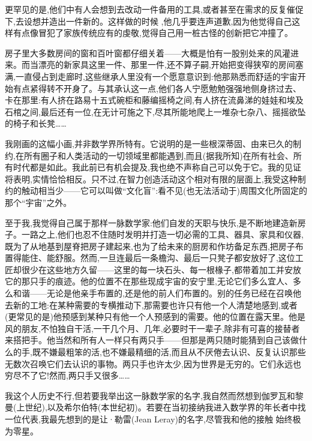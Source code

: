 更罕见的是,他们中有人会想到去改动一件备用的工具,或者甚至在需求的反复催促下,去设想并造出一件新的。这样做的时候
,他几乎要连声道歉,因为他觉得自己这样有点像冒犯了家族传统应有的虔敬,觉得自己用一桩古怪的创新把它冲撞了。

房子里大多数房间的窗和百叶窗都仔细关着——大概是怕有一股别处来的风灌进来。而当漂亮的新家具这里一件、那里一件,还不算子嗣,开始把变得狭窄的房间塞满,一直侵占到走廊时,这些继承人里没有一个愿意意识到:他那熟悉而舒适的宇宙开始有点紧得转不开身了。与其承认这一点,他们各人宁愿勉勉强强地侧身挤过去、卡在那里:有人挤在路易十五式碗柜和藤编摇椅之间,有人挤在流鼻涕的娃娃和埃及石棺之间,最后还有一位,在无计可施之下,尽其所能地爬上一堆杂七杂八、摇摇欲坠的椅子和长凳……

我刚画的这幅小画,并非数学界所特有。它说明的是一些根深蒂固、由来已久的制约,在所有圈子和人类活动的一切领域里都能遇到,而且(据我所知)在所有社会、所有时代都是如此。我此前已有机会提及,我也绝不声称自己可以免于它。我的见证将表明,实情恰恰相反。只不过,在智力创造活动这个相对有限的层面上,我受这种制约的触动相当少——它可以叫做“文化盲”:看不见(也无法活动于)周围文化所固定的那个“宇宙”之外。

至于我,我觉得自己属于那样一脉数学家:他们自发的天职与快乐,是不断地建造新房子。一路之上,他们也忍不住随时发明并打造一切必需的工具、器具、家具和仪器,既为了从地基到屋脊把房子建起来,也为了给未来的厨房和作坊备足东西,把房子布置得能住、能舒服。然而,一旦连最后一条檐沟、最后一只凳子都安放好了,这位工匠却很少在这些地方久留——这里的每一块石头、每一根椽子,都带着加工并安放它的那只手的痕迹。他的位置不在那些现成宇宙的安宁里,无论它们多么宜人、多么和谐——无论是他亲手布置的,还是他的前人们布置的。别的任务已经在召唤他去新的工地:在某种需要的专横推动下,那需要也许只有他一个人清楚地感到,或者(更常见的是)他预感到某种只有他一个人预感到的需要。他的位置在露天里。他是风的朋友,不怕独自干活,一干几个月、几年,必要时干一辈子,除非有可喜的接替者来搭把手。他当然和所有人一样只有两只手——但那是两只随时能猜到自己该做什么的手,既不嫌最粗笨的活,也不嫌最精细的活,而且从不厌倦去认识、反复认识那些无数次召唤它们去认识的事物。两只手也许太少,因为世界是无穷的。它们永远也穷尽不了它!然而,两只手又很多……

我这个人历史不行,但若要我举出这一脉数学家的名字,我自然而然想到伽罗瓦和黎曼(上世纪),以及希尔伯特(本世纪初)。若要在当初接纳我进入数学界的年长者中找一位代表,我最先想到的是让·勒雷(Jean Leray)的名字,尽管我和他的接触
始终极为零星。

